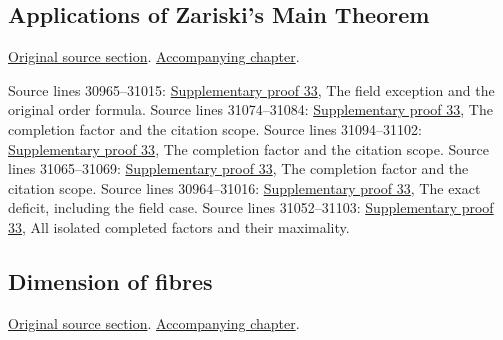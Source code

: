 \subsection{Applications of Zariski's Main Theorem}
\hypertarget{algebra-source-section-apply-main-theorem}{}
\noindent\href{https://github.com/stacks/stacks-project/blob/a04446e57ec1fbc252a871afcec7752fb2807b14/algebra.tex\#L30954}{Original source section}. \href{algebra.pdf\#nameddest=section-apply-main-theorem}{Accompanying chapter}.

\begin{AlgebraSourceRoutes}
 Source lines 30965--31015: \hyperlink{algebra_zariski_applications_notes_20260928}{Supplementary proof 33}, The field exception and the original order formula.
 Source lines 31074--31084: \hyperlink{algebra_zariski_applications_notes_20260928}{Supplementary proof 33}, The completion factor and the citation scope.
 Source lines 31094--31102: \hyperlink{algebra_zariski_applications_notes_20260928}{Supplementary proof 33}, The completion factor and the citation scope.
 Source lines 31065--31069: \hyperlink{algebra_zariski_applications_notes_20260928}{Supplementary proof 33}, The completion factor and the citation scope.
 Source lines 30964--31016: \hyperlink{algebra_zariski_applications_notes_20260928}{Supplementary proof 33}, The exact deficit, including the field case.
 Source lines 31052--31103: \hyperlink{algebra_zariski_applications_notes_20260928}{Supplementary proof 33}, All isolated completed factors and their maximality.
\end{AlgebraSourceRoutes}

\subsection{Dimension of fibres}
\hypertarget{algebra-source-section-dimension-fibres}{}
\noindent\href{https://github.com/stacks/stacks-project/blob/a04446e57ec1fbc252a871afcec7752fb2807b14/algebra.tex\#L31140}{Original source section}. \href{algebra.pdf\#nameddest=section-dimension-fibres}{Accompanying chapter}.

